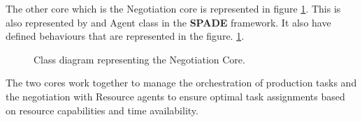 The other core which is the Negotiation core is represented in figure \ref{fig:negotiation_core_classes}.
This is also represented by and Agent class in the \textbf{SPADE} framework.
It also have defined behaviours that are represented in the figure. \ref{fig:negotiation_core_classes}.
\begin{figure}[ht]
    \centering
    
    \caption{Class diagram representing the Negotiation Core.}
    \label{fig:negotiation_core_classes}
\end{figure}

The two cores work together to manage the orchestration of production tasks and the negotiation with Resource agents to ensure optimal task assignments based on resource capabilities and time availability.

